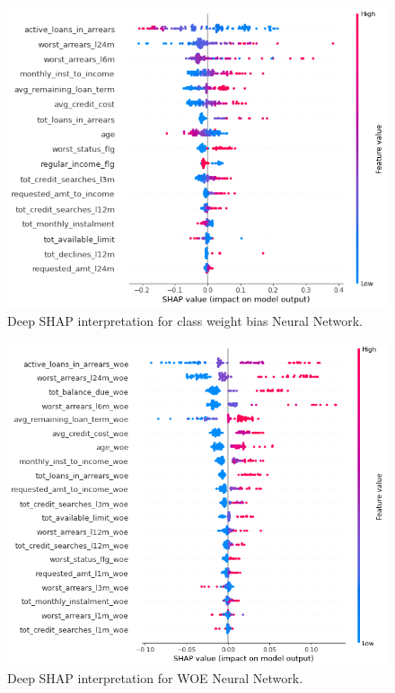 \begin  {figure}[!htpb]
\centering
  \includegraphics[width=0.8\linewidth]{Credit_Images/NN_shap_deep_weighted_summary.png}
   \caption{Deep SHAP interpretation for class weight bias Neural Network.}
    \label{fig-deep-shap-weighted-NN}
\end{figure}
\begin  {figure}[!htpb]
\centering
  \includegraphics[width=0.8\linewidth]{Credit_Images/WOE_IV_NOSCALE_MODEL.png}
   \caption{Deep SHAP interpretation for WOE Neural Network.}
    \label{fig-deep-shap-WOE-NN}
\end{figure}

